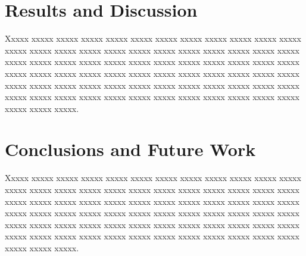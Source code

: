 \documentclass[conference]{IEEEtran}
\begin{document}
\section{Results and Discussion}
\label{sec:results_and_discussion}
Xxxxx xxxxx xxxxx  xxxxx  xxxxx  xxxxx  xxxxx  xxxxx  xxxxx  xxxxx  xxxxx  xxxxx  xxxxx  xxxxx  xxxxx  xxxxx  xxxxx  xxxxx  xxxxx  xxxxx  xxxxx  xxxxx  xxxxx  xxxxx  xxxxx  xxxxx  xxxxx  xxxxx  xxxxx  xxxxx  xxxxx  xxxxx  xxxxx  xxxxx  xxxxx  xxxxx  xxxxx  xxxxx  xxxxx  xxxxx  xxxxx  xxxxx  xxxxx  xxxxx  xxxxx  xxxxx  xxxxx  xxxxx  xxxxx  xxxxx  xxxxx  xxxxx  xxxxx  xxxxx  xxxxx  xxxxx  xxxxx  xxxxx  xxxxx  xxxxx  xxxxx  xxxxx  xxxxx  xxxxx  xxxxx  xxxxx  xxxxx  xxxxx  xxxxx  xxxxx  xxxxx  xxxxx  xxxxx  xxxxx  xxxxx.

\section{Conclusions and Future Work}
\label{sec:conclusion}
Xxxxx xxxxx xxxxx  xxxxx  xxxxx  xxxxx  xxxxx  xxxxx  xxxxx  xxxxx  xxxxx  xxxxx  xxxxx  xxxxx  xxxxx  xxxxx  xxxxx  xxxxx  xxxxx  xxxxx  xxxxx  xxxxx  xxxxx  xxxxx  xxxxx  xxxxx  xxxxx  xxxxx  xxxxx  xxxxx  xxxxx  xxxxx  xxxxx  xxxxx  xxxxx  xxxxx  xxxxx  xxxxx  xxxxx  xxxxx  xxxxx  xxxxx  xxxxx  xxxxx  xxxxx  xxxxx  xxxxx  xxxxx  xxxxx  xxxxx  xxxxx  xxxxx  xxxxx  xxxxx  xxxxx  xxxxx  xxxxx  xxxxx  xxxxx  xxxxx  xxxxx  xxxxx  xxxxx  xxxxx  xxxxx  xxxxx  xxxxx  xxxxx  xxxxx  xxxxx  xxxxx  xxxxx  xxxxx  xxxxx  xxxxx.





\end{document}
